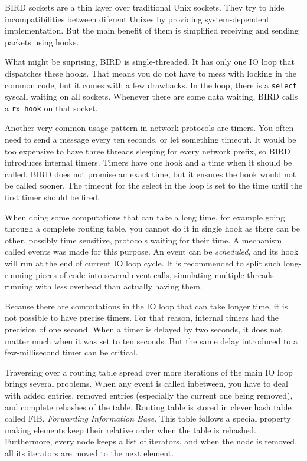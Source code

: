 BIRD sockets are a thin layer over traditional Unix sockets. They try to hide
incompatibilities between diferent Unixes by providing system-dependent
implementation. But the main benefit of them is simplified receiving and
sending packets using hooks.

What might be suprising, BIRD is single-threaded. It has only one IO loop that
dispatches these hooks. That means you do not have to mess with locking in the
common code, but it comes with a few drawbacks. In the loop, there is
a \texttt{select} syscall waiting on all sockets. Whenever there are some data
waiting, BIRD calls a \verb|rx_hook| on that socket.

Another very common usage pattern in network protocols are timers. You often
need to send a message every ten seconds, or let something timeout. It would be
too expensive to have three threads sleeping for every network prefix, so BIRD
introduces internal timers. Timers have one hook and a time when it should be
called. BIRD does not promise an exact time, but it ensures the hook would not
be called sooner. The timeout for the select in the loop is set to the time
until the first timer should be fired.

When doing some computations that can take a long time, for example going
through a complete routing table, you cannot do it in single hook as there can be
other, possibly time sensitive, protocols waiting for their time. A mechanism
called events was made for this purpose. An event can be \emph{scheduled},
and its hook will run at the end of current IO loop cycle. It is recommended to
split such long-running pieces of code into several event calls, simulating
multiple threads running with less overhead than actually having them.

Because there are computations in the IO loop that can take longer time, it is
not possible to have precise timers. For that reason, internal timers had the
precision of one second. When a timer is delayed by two seconds, it does not
matter much when it was set to ten seconds. But the same delay introduced to
a few-millisecond timer can be critical.

Traversing over a routing table spread over more iterations of the main IO loop
brings several problems. When any event is called inbetween, you have to deal
with added entries, removed entries (especially the current one being removed),
and complete rehashes of the table. Routing table is stored in clever hash
table called FIB, \emph{Forwarding Information Base}. This table follows
a special property making elements keep their relative order when the table is
rehashed. Furthermore, every node keeps a list of iterators, and when the node
is removed, all its iterators are moved to the next element.

